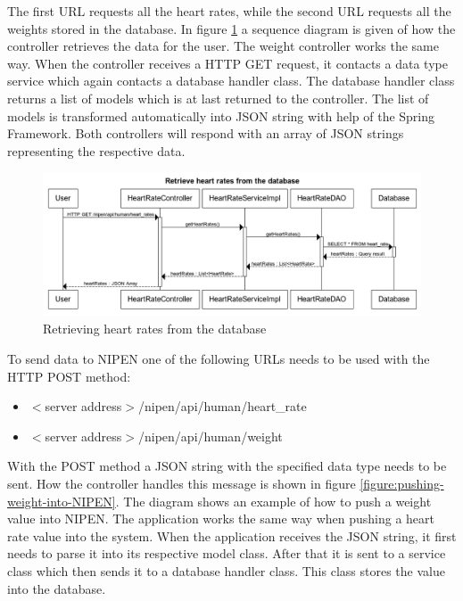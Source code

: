 The first URL requests all the heart rates, while the second URL requests all the weights stored in the database.
In figure \ref{figure:retrieve-heart-rates-from-the-database} a sequence diagram is given of how the controller retrieves the data for the user.
The weight controller works the same way.
When the controller receives a HTTP GET request, it contacts a data type service which again contacts a database handler class.
The database handler class returns a list of models which is at last returned to the controller.
The list of models is transformed automatically into JSON string with help of the Spring Framework.
Both controllers will respond with an array of JSON strings representing the respective data.

\begin{figure}[h]
\centering
\includegraphics[scale=0.6]{../Figures/retrieve-heart-rates-from-the-database.png}
\caption{Retrieving heart rates from the database}
\label{figure:retrieve-heart-rates-from-the-database}
\end{figure}

To send data to NIPEN one of the following URLs needs to be used with the HTTP POST method:

\begin{itemize}
\item $<$server address$>$/nipen/api/human/heart\_rate
\item $<$server address$>$/nipen/api/human/weight
\end{itemize}

With the POST method a JSON string with the specified data type needs to be sent. 
How the controller handles this message is shown in figure \ref{figure:pushing-weight-into-NIPEN}.
The diagram shows an example of how to push a weight value into NIPEN.
The application works the same way when pushing a heart rate value into the system.
When the application receives the JSON string, it first needs to parse it into its respective model class.
After that it is sent to a service class which then sends it to a database handler class.
This class stores the value into the database.

